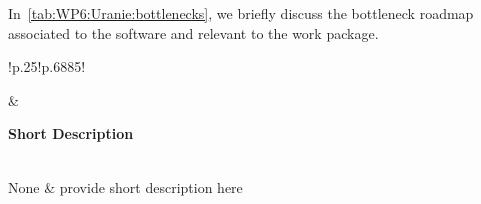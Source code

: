 In~\cref{tab:WP6:Uranie:bottlenecks}, we briefly discuss the bottleneck roadmap associated to the software and relevant to the work package.

\begin{table}[h!]
    \centering
    
    

    \centering
    { 
        \setlength{\parindent}{0pt}
        \def\arraystretch{1.25}
        {
            \fontsize{9}{11}\selectfont
            \begin{tabular}{!{\color{numpexgray}\vrule}p{.25\linewidth}!{\color{numpexgray}\vrule}p{.6885\linewidth}!{\color{numpexgray}\vrule}}
    
     &  {\rule{0pt}{2.5ex}\color{white}\bf Short Description }\\ 
    
    None & provide short description here \\
\end{tabular}
        }
    }
    \caption{WP6: Uranie plan with Respect to Relevant Bottlenecks}
    \label{tab:WP6:Uranie:bottlenecks}
\end{table}